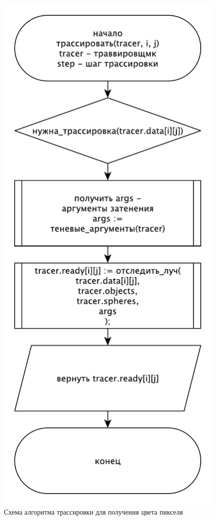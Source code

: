{    \begin{figure}[H]
    	\centering
    	\includegraphics[height=0.5\textheight]{img/trace2.pdf}
    	\caption{Схема алгоритма трассировки для получения цвета пикселя}
    	\label{fig:trace2}
    \end{figure}
}